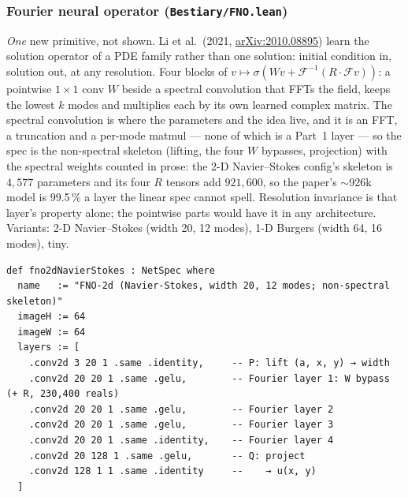 \subsubsection*{Fourier neural operator (\texttt{Bestiary/FNO.lean})}
\emph{One} new primitive, not shown. Li et al.\ (2021,
\href{https://arxiv.org/abs/2010.08895}{arXiv:2010.08895}) learn the solution
operator of a PDE family rather than one solution: initial condition
in, solution out, at any resolution. Four blocks of $v \mapsto \sigma(Wv +
\mathcal{F}^{-1}(R \cdot \mathcal{F} v))$: a pointwise $1 \times 1$ conv $W$
beside a spectral convolution that FFTs the field, keeps the lowest $k$ modes
and multiplies each by its own learned complex matrix. The spectral
convolution is where the parameters and the idea live, and it is an FFT, a
truncation and a per-mode matmul --- none of which is a Part~1 layer --- so
the spec is the non-spectral skeleton (lifting, the four $W$ bypasses,
projection) with the spectral weights counted in prose: the 2-D
Navier--Stokes config's skeleton is $4{,}577$ parameters and its four $R$
tensors add $921{,}600$, so the paper's $\sim$926k model is 99.5\,\% a layer
the linear spec cannot spell. Resolution invariance is that layer's property
alone; the pointwise parts would have it in any architecture. Variants: 2-D
Navier--Stokes (width 20, 12 modes), 1-D Burgers (width 64, 16 modes), tiny.

\begin{verbatim}
def fno2dNavierStokes : NetSpec where
  name   := "FNO-2d (Navier-Stokes, width 20, 12 modes; non-spectral skeleton)"
  imageH := 64
  imageW := 64
  layers := [
    .conv2d 3 20 1 .same .identity,     -- P: lift (a, x, y) → width
    .conv2d 20 20 1 .same .gelu,        -- Fourier layer 1: W bypass (+ R, 230,400 reals)
    .conv2d 20 20 1 .same .gelu,        -- Fourier layer 2
    .conv2d 20 20 1 .same .gelu,        -- Fourier layer 3
    .conv2d 20 20 1 .same .identity,    -- Fourier layer 4
    .conv2d 20 128 1 .same .gelu,       -- Q: project
    .conv2d 128 1 1 .same .identity     --    → u(x, y)
  ]
\end{verbatim}

